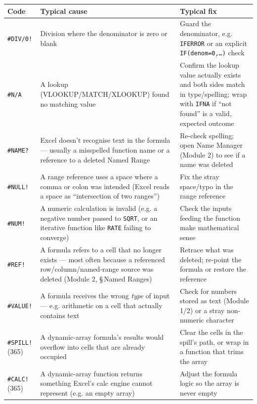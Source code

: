 \documentclass[11pt,a4paper]{article}
\begin{document}
\begin{center}
\begin{tabular}{@{}L{1.9cm}L{4.9cm}L{5.0cm}@{}}
\toprule
\textbf{Code} & \textbf{Typical cause} & \textbf{Typical fix} \\
\midrule
\texttt{\#DIV/0!} & Division where the denominator is zero or blank & Guard the denominator, e.g. \texttt{IFERROR} or an explicit \texttt{IF(denom=0,\ldots)} check \\
\texttt{\#N/A} & A lookup (VLOOKUP/\allowbreak MATCH/\allowbreak XLOOKUP) found no matching value & Confirm the lookup value actually exists and both sides match in type/spelling; wrap with \texttt{IFNA} if ``not found'' is a valid, expected outcome \\
\texttt{\#NAME?} & Excel doesn't recognise text in the formula --- usually a misspelled function name or a reference to a deleted Named Range & Re-check spelling; open Name Manager (Module 2) to see if a name was deleted \\
\texttt{\#NULL!} & A range reference uses a space where a comma or colon was intended (Excel reads a space as ``intersection of two ranges'') & Fix the stray space/typo in the range reference \\
\texttt{\#NUM!} & A numeric calculation is invalid (e.g. a negative number passed to \texttt{SQRT}, or an iterative function like \texttt{RATE} failing to converge) & Check the inputs feeding the function make mathematical sense \\
\texttt{\#REF!} & A formula refers to a cell that no longer exists --- most often because a referenced row/column/named-range source was deleted (Module 2, \S\,Named Ranges) & Retrace what was deleted; re-point the formula or restore the reference \\
\texttt{\#VALUE!} & A formula receives the wrong \emph{type} of input --- e.g. arithmetic on a cell that actually contains text & Check for numbers stored as text (Module 1/2) or a stray non-numeric character \\
\texttt{\#SPILL!} (365) & A dynamic-array formula's results would overflow into cells that are already occupied & Clear the cells in the spill's path, or wrap in a function that trims the array \\
\texttt{\#CALC!} (365) & A dynamic-array function returns something Excel's calc engine cannot represent (e.g. an empty array) & Adjust the formula logic so the array is never empty \\
\bottomrule
\end{tabular}
\end{center}
\end{document}
